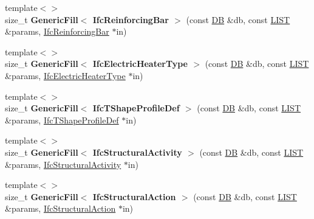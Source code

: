 \begin{DoxyCompactItemize}
\item 
\hypertarget{namespace_assimp_1_1_s_t_e_p_a9077eac3837944af8e696dda4c874d78}{{\footnotesize template$<$$>$ }\\size\+\_\+t {\bfseries Generic\+Fill$<$ Ifc\+Reinforcing\+Bar $>$} (const \hyperlink{class_assimp_1_1_s_t_e_p_1_1_d_b}{D\+B} \&db, const \hyperlink{class_assimp_1_1_s_t_e_p_1_1_e_x_p_r_e_s_s_1_1_l_i_s_t}{L\+I\+S\+T} \&params, \hyperlink{struct_assimp_1_1_i_f_c_1_1_ifc_reinforcing_bar}{Ifc\+Reinforcing\+Bar} $\ast$in)}\label{namespace_assimp_1_1_s_t_e_p_a9077eac3837944af8e696dda4c874d78}

\item 
\hypertarget{namespace_assimp_1_1_s_t_e_p_a98888d2aebe60613419024e2b591e1cc}{{\footnotesize template$<$$>$ }\\size\+\_\+t {\bfseries Generic\+Fill$<$ Ifc\+Electric\+Heater\+Type $>$} (const \hyperlink{class_assimp_1_1_s_t_e_p_1_1_d_b}{D\+B} \&db, const \hyperlink{class_assimp_1_1_s_t_e_p_1_1_e_x_p_r_e_s_s_1_1_l_i_s_t}{L\+I\+S\+T} \&params, \hyperlink{struct_assimp_1_1_i_f_c_1_1_ifc_electric_heater_type}{Ifc\+Electric\+Heater\+Type} $\ast$in)}\label{namespace_assimp_1_1_s_t_e_p_a98888d2aebe60613419024e2b591e1cc}

\item 
\hypertarget{namespace_assimp_1_1_s_t_e_p_a98e6bd6d4590cbc020776828eba66114}{{\footnotesize template$<$$>$ }\\size\+\_\+t {\bfseries Generic\+Fill$<$ Ifc\+T\+Shape\+Profile\+Def $>$} (const \hyperlink{class_assimp_1_1_s_t_e_p_1_1_d_b}{D\+B} \&db, const \hyperlink{class_assimp_1_1_s_t_e_p_1_1_e_x_p_r_e_s_s_1_1_l_i_s_t}{L\+I\+S\+T} \&params, \hyperlink{struct_assimp_1_1_i_f_c_1_1_ifc_t_shape_profile_def}{Ifc\+T\+Shape\+Profile\+Def} $\ast$in)}\label{namespace_assimp_1_1_s_t_e_p_a98e6bd6d4590cbc020776828eba66114}

\item 
\hypertarget{namespace_assimp_1_1_s_t_e_p_a9ffd4fcc40462bbece0606cb615d4c2b}{{\footnotesize template$<$$>$ }\\size\+\_\+t {\bfseries Generic\+Fill$<$ Ifc\+Structural\+Activity $>$} (const \hyperlink{class_assimp_1_1_s_t_e_p_1_1_d_b}{D\+B} \&db, const \hyperlink{class_assimp_1_1_s_t_e_p_1_1_e_x_p_r_e_s_s_1_1_l_i_s_t}{L\+I\+S\+T} \&params, \hyperlink{struct_assimp_1_1_i_f_c_1_1_ifc_structural_activity}{Ifc\+Structural\+Activity} $\ast$in)}\label{namespace_assimp_1_1_s_t_e_p_a9ffd4fcc40462bbece0606cb615d4c2b}

\item 
\hypertarget{namespace_assimp_1_1_s_t_e_p_acd190d3ecd6a3dcf9f7162202cd8ffcc}{{\footnotesize template$<$$>$ }\\size\+\_\+t {\bfseries Generic\+Fill$<$ Ifc\+Structural\+Action $>$} (const \hyperlink{class_assimp_1_1_s_t_e_p_1_1_d_b}{D\+B} \&db, const \hyperlink{class_assimp_1_1_s_t_e_p_1_1_e_x_p_r_e_s_s_1_1_l_i_s_t}{L\+I\+S\+T} \&params, \hyperlink{struct_assimp_1_1_i_f_c_1_1_ifc_structural_action}{Ifc\+Structural\+Action} $\ast$in)}\label{namespace_assimp_1_1_s_t_e_p_acd190d3ecd6a3dcf9f7162202cd8ffcc}


\end{DoxyCompactItemize}
